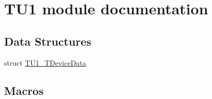 \hypertarget{group___t_u1__module}{}\section{T\+U1 module documentation}
\label{group___t_u1__module}
\subsection*{Data Structures}
\begin{DoxyCompactItemize}
\item 
struct \hyperlink{struct_t_u1___t_device_data}{T\+U1\+\_\+\+T\+Device\+Data}
\end{DoxyCompactItemize}
\subsection*{Macros}
